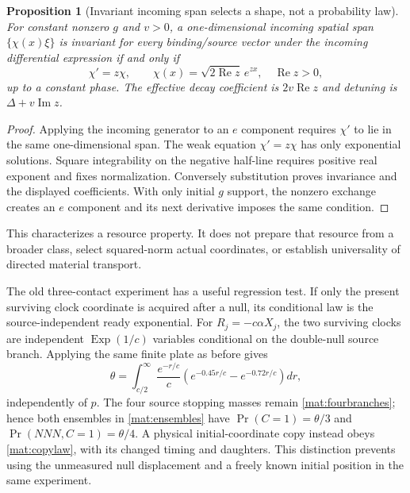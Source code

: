 \documentclass[11pt,oneside,openany]{book}
\newtheorem{proposition}[theorem]{Proposition}
\theoremstyle{definition}
\theoremstyle{remark}\newtheorem{remark}[theorem]{Remark}
\begin{document}
\begin{proposition}[Invariant incoming span selects a shape, not a probability law]
\label{mat:profile}
For constant nonzero $g$ and $v>0$, a one-dimensional incoming spatial span $\{\chi(x)\xi\}$ is invariant for every binding/source vector under the incoming differential expression if and only if
\[
 \chi'=z\chi,\qquad
 \chi(x)=\sqrt{2\operatorname{Re}z}\,e^{zx},
 \quad\operatorname{Re}z>0,
\]
up to a constant phase. The effective decay coefficient is $2v\operatorname{Re}z$ and detuning is $\Delta+v\operatorname{Im}z$.
\end{proposition}
\begin{proof}
Applying the incoming generator to an $e$ component requires $\chi'$ to lie in the same one-dimensional span. The weak equation $\chi'=z\chi$ has only exponential solutions. Square integrability on the negative half-line requires positive real exponent and fixes normalization. Conversely substitution proves invariance and the displayed coefficients. With only initial $g$ support, the nonzero exchange creates an $e$ component and its next derivative imposes the same condition.
\end{proof}

This characterizes a resource property. It does not prepare that resource from a broader class, select squared-norm actual coordinates, or establish universality of directed material transport.

The old three-contact experiment has a useful regression test. If only the present surviving clock coordinate is acquired after a null, its conditional law is the source-independent ready exponential. For $R_j=-c\alpha X_j$, the two surviving clocks are independent $\operatorname{Exp}(1/c)$ variables conditional on the double-null source branch. Applying the same finite plate as before gives
\[
 \theta=\int_{c/2}^{\infty}\frac{e^{-r/c}}c
       \left(e^{-0.45r/c}-e^{-0.72r/c}\right)dr,
\]
independently of $p$. The four source stopping masses remain \eqref{mat:fourbranches}; hence both ensembles in \eqref{mat:ensembles} have $\Pr(C=1)=\theta/3$ and $\Pr(NNN,C=1)=\theta/4$. A physical initial-coordinate copy instead obeys \eqref{mat:copylaw}, with its changed timing and daughters. This distinction prevents using the unmeasured null displacement and a freely known initial position in the same experiment.
\end{document}
